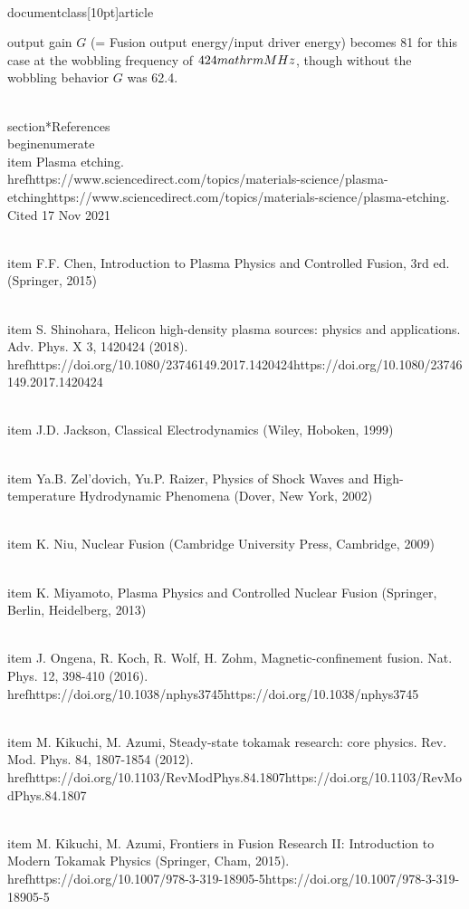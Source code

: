 \\documentclass[10pt]{article}
\begin{document}
{{{{{{output gain $G$ (= Fusion output energy/input driver energy) becomes 81 for this case at the wobbling frequency of $424 \\mathrm{MHz}$, though without the wobbling behavior $G$ was 62.4.

\\section*{References}
\\begin{enumerate}
  \\item Plasma etching. \\href{https://www.sciencedirect.com/topics/materials-science/plasma-etching}{https://www.sciencedirect.com/topics/materials-science/plasma-etching}. Cited 17 Nov 2021

  \\item F.F. Chen, Introduction to Plasma Physics and Controlled Fusion, 3rd ed. (Springer, 2015)

  \\item S. Shinohara, Helicon high-density plasma sources: physics and applications. Adv. Phys. X 3, 1420424 (2018). \\href{https://doi.org/10.1080/23746149.2017.1420424}{https://doi.org/10.1080/23746149.2017.1420424}

  \\item J.D. Jackson, Classical Electrodynamics (Wiley, Hoboken, 1999)

  \\item Ya.B. Zel'dovich, Yu.P. Raizer, Physics of Shock Waves and High-temperature Hydrodynamic Phenomena (Dover, New York, 2002)

  \\item K. Niu, Nuclear Fusion (Cambridge University Press, Cambridge, 2009)

  \\item K. Miyamoto, Plasma Physics and Controlled Nuclear Fusion (Springer, Berlin, Heidelberg, 2013)

  \\item J. Ongena, R. Koch, R. Wolf, H. Zohm, Magnetic-confinement fusion. Nat. Phys. 12, 398-410 (2016). \\href{https://doi.org/10.1038/nphys3745}{https://doi.org/10.1038/nphys3745}

  \\item M. Kikuchi, M. Azumi, Steady-state tokamak research: core physics. Rev. Mod. Phys. 84, 1807-1854 (2012). \\href{https://doi.org/10.1103/RevModPhys.84.1807}{https://doi.org/10.1103/RevModPhys.84.1807}

  \\item M. Kikuchi, M. Azumi, Frontiers in Fusion Research II: Introduction to Modern Tokamak Physics (Springer, Cham, 2015). \\href{https://doi.org/10.1007/978-3-319-18905-5}{https://doi.org/10.1007/978-3-319-18905-5}

}}}}}}
\end{document}
